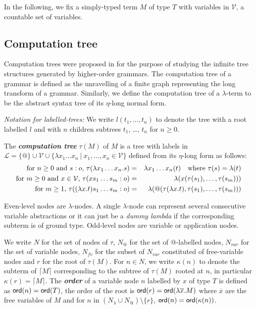 \documentclass{llncs}
\newcommand\defname[1]{{\bf\em #1}\index{#1}}
\newcommand{\elnf}[1]{\lceil #1\rceil} %
\newcommand\union{\cup}
\begin{document}
In the following, we fix a simply-typed term $M$ of type $T$ with variables in $\mathcal{V}$, a countable set of variables.
\subsection{Computation tree}

Computation trees were proposed in \cite{OngLics2006} for the purpose of studying the infinite tree structures generated by higher-order grammars. The computation tree of a grammar is defined as the unravelling of a finite graph representing the long transform of a grammar. Similarly, we define the computation tree of a $\lambda$-term to be the abstract syntax tree of its $\eta$-long normal form.

\emph{Notation for labelled-trees:} We write $l(t_1, \ldots, t_n)$ to denote the tree with a root labelled $l$ and with $n$ children subtrees $t_1$, \ldots, $t_n$ for $
n \geq 0$.

\begin{definition}\rm
  The \defname{computation tree} $\tau(M)$ of $M$ is a tree with
  labels in $ \mathcal{L} = \{ @ \} \union \mathcal{V} \union \{
  \lambda x_1 \ldots x_n \ | \ x_1 ,\ldots, x_n \in \mathcal{V} \}$
  defined from its $\eta$-long form as follows:
\begin{eqnarray*}
  \mbox{for $n\geq 0$ and $s:o$, } \tau(\lambda x_1 \ldots x_n . s) &=& \lambda x_1 \ldots x_n(t) \mbox{\quad where $\tau(s) = \lambda(t)$}\\
  \mbox{for $m\geq 0$ and $x \in  \mathcal{V}$, } \tau( x s_1 \ldots s_m : o) &=&  \lambda (x(\tau(s_1),\ldots,\tau(s_m)))\\
  \mbox{for $m \geq 1$, } \tau((\lambda x.t) s_1 \ldots s_m :o) &=& \lambda (@(\tau(\lambda x.t),\tau(s_1),\ldots,\tau(s_m)))
\end{eqnarray*}
\end{definition}

Even-level nodes are $\lambda$-nodes. A single $\lambda$-node can represent several consecutive variable abstractions or it can just be
a \textsl{dummy lambda} if the corresponding subterm is of ground type.
Odd-level nodes are variable or application nodes.

We write $N$ for the set of nodes of $\tau$, $N_@$ for the set of @-labelled nodes,
$N_{var}$ for the set of variable nodes,
$N_{fv}$ for the subset of $N_{var}$ constituted of free-variable nodes and $r$ for the root of $\tau(M)$.
For $n \in N$, we write $\kappa(n)$ to denote the subterm of $\elnf{M}$
corresponding to the subtree of $\tau(M)$ rooted at $n$, in particular $\kappa(r) = \elnf{M}$.
The \defname{order} of a variable node $n$ labelled by $x$ of type $T$ 
is defined as ${\sf ord}(n) = {\sf ord}(T)$, the order of the root is ${\sf ord}(r) = {\sf ord}(\lambda \overline{x} . M)$ where $\overline{x}$ are the free variables of $M$ and for $n$ in $(N_\lambda \union N_@) \setminus \{ r \}$, ${\sf ord}(n) = {\sf ord}(\kappa(n))$.
\end{document}
